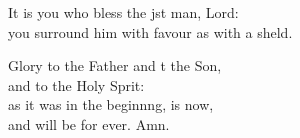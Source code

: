 \begin{psalmverse}
\begin{patverse}
It is you who bless the jst man, Lord:\Med\\
    you surround him with favour as with a sh\pointup{\i}eld.

Glory to the Father and t the Son,\Med\\
    and to the Holy Sp\pointup{\i}rit:\\
as it was in the beginn\pointup{\i}ng, is now,\Med\\
    and will be for ever. Amn.
  \end{patverse}
\end{psalmverse}

